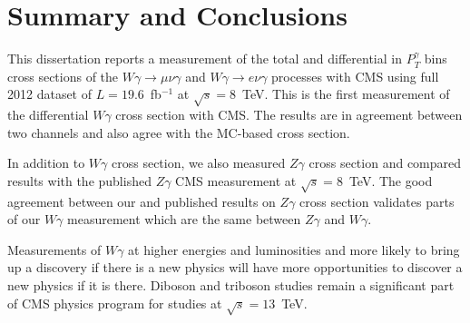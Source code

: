\chapter{Summary and Conclusions}
\label{sec:Conclusions}

This dissertation reports a measurement of the total and differential in $P_T^{\gamma}$ bins cross sections of the $W\gamma\rightarrow\mu\nu\gamma$ and $W\gamma\rightarrow e\nu\gamma$ processes with CMS using full 2012 dataset of $L=19.6$~fb$^{-1}$ at $\sqrt{s}=8$~TeV. This is the first measurement of the differential $W\gamma$ cross section with CMS. The results are in agreement between two channels and also agree with the MC-based cross section.

In addition to $W\gamma$ cross section, we also measured $Z\gamma$ cross section and compared results with the published $Z\gamma$ CMS measurement at $\sqrt{s}=8$~TeV. The good agreement between our and published results on $Z\gamma$ cross section validates parts of our $W\gamma$ measurement which are the same between $Z\gamma$ and $W\gamma$.

Measurements of $W\gamma$ at higher energies and luminosities and more likely to bring up a discovery if there is a new physics will have more opportunities to discover a new physics if it is there. Diboson and triboson studies remain a significant part of CMS physics program for studies at $\sqrt{s}=13$~TeV.

